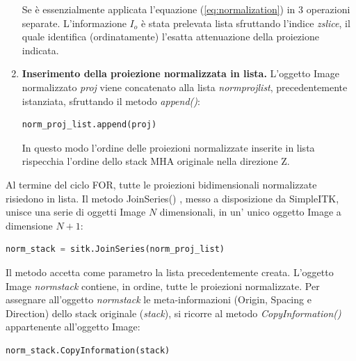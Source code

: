 \documentclass[a4paper,12pt, doubleside]{report}
\begin{document}
\begin{enumerate}
                    Se è essenzialmente applicata l'equazione (\ref{eq:normalization}) in 3 operazioni separate. L'informazione $I_o$ è stata prelevata lista sfruttando l'indice \textit{zslice}, il quale identifica (ordinatamente) l'esatta attenuazione della proiezione indicata.
                    
                    \item \textbf{Inserimento della proiezione normalizzata in lista.} L'oggetto Image normalizzato \textit{proj} viene concatenato alla lista \textit{norm\textunderscore proj\textunderscore list}, precedentemente istanziata, sfruttando il metodo \textit{append()}:
                    
                    \begin{lstlisting}[language=python, frame=bt]
norm_proj_list.append(proj)
                    \end{lstlisting}
                    
                    In questo modo l'ordine delle proiezioni normalizzate inserite in lista rispecchia l'ordine dello stack MHA originale nella direzione Z.
                \end{enumerate}
                
                Al termine del ciclo FOR, tutte le proiezioni bidimensionali normalizzate risiedono in lista. Il metodo JoinSeries() \cite{sitk-joinseries}, messo a disposizione da SimpleITK, unisce una serie di oggetti Image $N$ dimensionali, in un' unico oggetto Image a dimensione $N+1$:
                
                \begin{lstlisting}[language=python, frame=bt]
norm_stack = sitk.JoinSeries(norm_proj_list)
                \end{lstlisting}
                    
                Il metodo accetta come parametro la lista precedentemente creata. L'oggetto Image \textit{norm\textunderscore stack} contiene, in ordine, tutte le proiezioni normalizzate. Per assegnare all'oggetto \textit{norm\textunderscore stack} le meta-informazioni (Origin, Spacing e Direction) dello stack originale (\textit{stack}), si ricorre al metodo \textit{CopyInformation()} \cite{sitk-copy-information} appartenente all'oggetto Image:
                
                \begin{lstlisting}[language=python, frame=bt]
norm_stack.CopyInformation(stack)
                \end{lstlisting}
                
\end{document}
